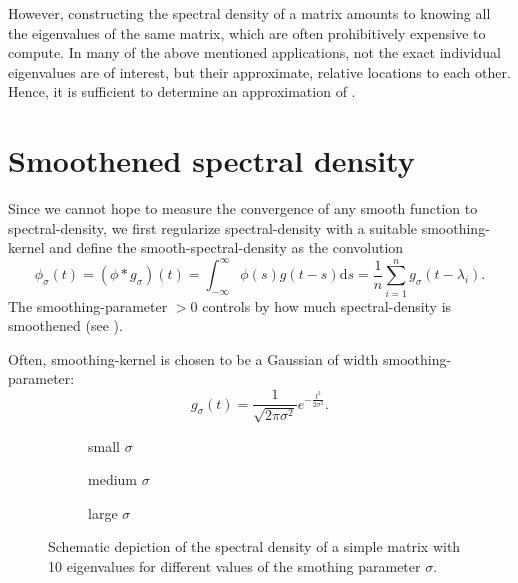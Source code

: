However, constructing the spectral density of a matrix amounts to knowing all
the eigenvalues of the same matrix, which are often prohibitively expensive to
compute. In many of the above mentioned applications, not the exact individual
eigenvalues are of interest, but their approximate, relative locations to each
other. Hence, it is sufficient to determine an approximation of .


\section{Smoothened spectral density}
\label{sec:1-introduction-properties}

Since we cannot hope to measure the convergence of any smooth function to \gls{spectral-density},
we first regularize \gls{spectral-density} with a suitable \gls{smoothing-kernel} \cite{epanechnikov1969kernel}
and define the \gls{smooth-spectral-density} as the convolution
\begin{equation}
    \phi_{\sigma}(t) = (\phi \ast g_{\sigma})(t) = \int_{-\infty}^{\infty} \phi(s) g(t - s) \mathrm{d}s = \frac{1}{n} \sum_{i=1}^{n} g_{\sigma}(t - \lambda_i).
    \label{equ:1-introduction-def-smooth-spectral-density}
\end{equation}
The \gls{smoothing-parameter} $>0$ controls by how much \gls{spectral-density} is
smoothened (see ).

Often, \gls{smoothing-kernel} is chosen to be a Gaussian of width \gls{smoothing-parameter}:
\begin{equation}
    g_{\sigma}(t) = \frac{1}{\sqrt{2 \pi \sigma^2}} e^{-\frac{t^2}{2\sigma^2}}.
    \label{equ:1-introduction-def-gaussian-kernel}
\end{equation}

\begin{figure}[ht]
    \begin{subfigure}[b]{0.33\columnwidth}
        
        \caption{small $\sigma$}
        \label{fig:1-introduction-spectral-density-example-0.01}
    \end{subfigure}
    \begin{subfigure}[b]{0.33\columnwidth}
        
        \caption{medium $\sigma$}
        \label{fig:1-introduction-spectral-density-example-0.02}
    \end{subfigure}
    \begin{subfigure}[b]{0.33\columnwidth}
        
        \caption{large $\sigma$}
        \label{fig:1-introduction-spectral-density-example-0.05}
    \end{subfigure}
    \caption{Schematic depiction of the spectral density of a simple matrix with
    10 eigenvalues for different values of the smothing parameter $\sigma$.}
    \label{fig:1-introduction-smoothened-spectral-density}
\end{figure}

